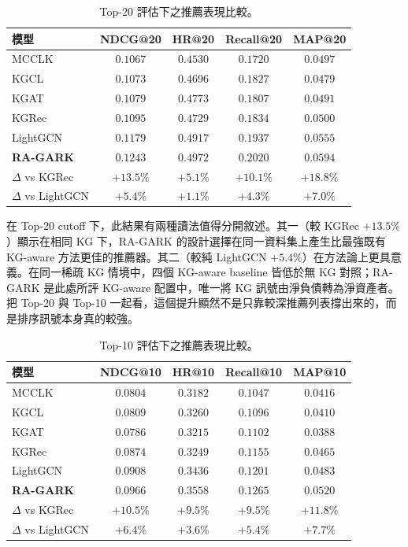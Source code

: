 \begin{table}[H]
\centering
\caption{Top-20 評估下之推薦表現比較。}
\label{tab:main-zh}
\begin{tabular}{lcccc}
\toprule
模型 & NDCG@20 & HR@20 & Recall@20 & MAP@20 \\
\midrule
MCCLK~\cite{zou2022mcclk}   & $0.1067$ & $0.4530$ & $0.1720$ & $0.0497$ \\
KGCL~\cite{yang2022kgcl}    & $0.1073$ & $0.4696$ & $0.1827$ & $0.0479$ \\
KGAT~\cite{wang2019kgat}    & $0.1079$ & $0.4773$ & $0.1807$ & $0.0491$ \\
KGRec~\cite{yang2023kgrec}  & $0.1095$ & $0.4729$ & $0.1834$ & $0.0500$ \\
LightGCN~\cite{he2020lightgcn} & $0.1179$ & $0.4917$ & $0.1937$ & $0.0555$ \\
\midrule
\textbf{RA-GARK}     & $\mathbf{0.1243}$ & $\mathbf{0.4972}$ & $\mathbf{0.2020}$ & $\mathbf{0.0594}$ \\
\midrule
$\Delta$ vs KGRec            & $+13.5\%$ & $+5.1\%$  & $+10.1\%$ & $+18.8\%$ \\
$\Delta$ vs LightGCN         & $+5.4\%$  & $+1.1\%$  & $+4.3\%$  & $+7.0\%$  \\
\bottomrule
\end{tabular}
\end{table}

在 Top-20 cutoff 下，此結果有兩種讀法值得分開敘述。其一（較 KGRec $+13.5\%$）顯示在相同 KG 下，RA-GARK 的設計選擇在同一資料集上產生比最強既有 KG-aware 方法更佳的推薦器。其二（較純 LightGCN $+5.4\%$）在方法論上更具意義。在同一稀疏 KG 情境中，四個 KG-aware baseline 皆低於無 KG 對照；RA-GARK 是此處所評 KG-aware 配置中，唯一將 KG 訊號由淨負債轉為淨資產者。把 Top-20 與 Top-10 一起看，這個提升顯然不是只靠較深推薦列表撐出來的，而是排序訊號本身真的較強。

\begin{table}[H]
\centering
\caption{Top-10 評估下之推薦表現比較。}
\label{tab:main10-zh}
\begin{tabular}{lcccc}
\toprule
模型 & NDCG@10 & HR@10 & Recall@10 & MAP@10 \\
\midrule
MCCLK~\cite{zou2022mcclk}   & $0.0804$ & $0.3182$ & $0.1047$ & $0.0416$ \\
KGCL~\cite{yang2022kgcl}    & $0.0809$ & $0.3260$ & $0.1096$ & $0.0410$ \\
KGAT~\cite{wang2019kgat}    & $0.0786$ & $0.3215$ & $0.1102$ & $0.0388$ \\
KGRec~\cite{yang2023kgrec}  & $0.0874$ & $0.3249$ & $0.1155$ & $0.0465$ \\
LightGCN~\cite{he2020lightgcn} & $0.0908$ & $0.3436$ & $0.1201$ & $0.0483$ \\
\midrule
\textbf{RA-GARK}     & $\mathbf{0.0966}$ & $\mathbf{0.3558}$ & $\mathbf{0.1265}$ & $\mathbf{0.0520}$ \\
\midrule
$\Delta$ vs KGRec            & $+10.5\%$ & $+9.5\%$  & $+9.5\%$  & $+11.8\%$ \\
$\Delta$ vs LightGCN         & $+6.4\%$  & $+3.6\%$  & $+5.4\%$  & $+7.7\%$  \\
\bottomrule
\end{tabular}
\end{table}
\FloatBarrier


